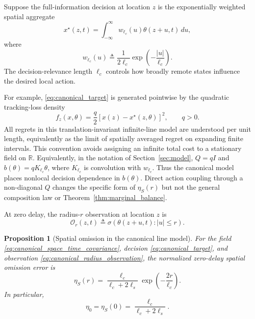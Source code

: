 \documentclass[11pt]{article}
\newtheorem{proposition}{Proposition}
\begin{document}
Suppose the full-information decision at location $z$ is the exponentially
weighted spatial aggregate
\begin{equation}
    x^\star(z,t)
    =
    \int_{-\infty}^{\infty}
    w_{\ell_c}(u)
    \theta(z+u,t)\,du,
    \label{eq:canonical_target}
\end{equation}
where
\begin{equation}
    w_{\ell_c}(u)
    \triangleq
    \frac{1}{2\ell_c}
    \exp
    \left(
        -\frac{|u|}{\ell_c}
    \right).
    \label{eq:exponential_decision_kernel}
\end{equation}
The decision-relevance length $\ell_c$ controls how broadly remote states
influence the desired local action.

For example, \eqref{eq:canonical_target} is generated pointwise by the
quadratic tracking-loss density
\begin{equation}
    f_z(x,\theta)
    =
    \frac{q}{2}
    \left[
        x(z)-x^\star(z,\theta)
    \right]^2,
    \qquad q>0.
    \label{eq:canonical_tracking_cost}
\end{equation}
All regrets in this translation-invariant infinite-line model are understood
per unit length, equivalently as the limit of spatially averaged regret on
expanding finite intervals. This convention avoids assigning an infinite total
cost to a stationary field on $\mathbb{R}$. Equivalently, in the notation of
Section~\ref{sec:model}, $Q=qI$ and
$b(\theta)=qK_{\ell_c}\theta$, where $K_{\ell_c}$ is convolution with
$w_{\ell_c}$. Thus the canonical model places nonlocal decision dependence in
$b(\theta)$. Direct action coupling through a non-diagonal $Q$ changes the
specific form of $\eta_S(r)$ but not the general composition law or
Theorem~\ref{thm:marginal_balance}.

At zero delay, the radius-$r$ observation at location $z$ is
\begin{equation}
    \mathcal{O}_r(z,t)
    \triangleq
    \sigma
    \left(
        \theta(z+u,t):
        |u|\le r
    \right).
    \label{eq:canonical_radius_observation}
\end{equation}

\begin{proposition}[Spatial omission in the canonical line model]
\label{prop:canonical_eta_S}
For the field \eqref{eq:canonical_space_time_covariance}, decision
\eqref{eq:canonical_target}, and observation
\eqref{eq:canonical_radius_observation}, the normalized zero-delay spatial
omission error is
\begin{equation}
    \boxed{
    \eta_S(r)
    =
    \frac{
        \ell_c
    }{
        \ell_c+2\ell_s
    }
    \exp
    \left(
        -\frac{2r}{\ell_c}
    \right).
    }
    \label{eq:canonical_eta_S}
\end{equation}
In particular,
\begin{equation}
    \eta_0
    =
    \eta_S(0)
    =
    \frac{
        \ell_c
    }{
        \ell_c+2\ell_s
    }.
    \label{eq:canonical_eta_zero}
\end{equation}
\end{proposition}
\end{document}

